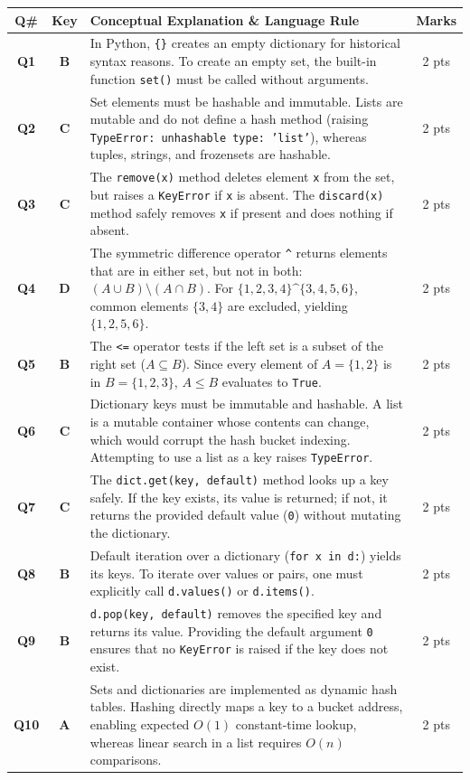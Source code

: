 \documentclass[11pt,a4paper]{article}
\begin{document}
\begin{center}
\renewcommand{\arraystretch}{1.28}
\small
\begin{tabularx}{\textwidth}{|c|c|X|c|}
\hline
\textbf{Q\#} & \textbf{Key} & \textbf{Conceptual Explanation \& Language Rule} & \textbf{Marks} \\
\hline
\textbf{Q1} & \textbf{B} & In Python, \texttt{\{\}} creates an empty dictionary for historical syntax reasons. To create an empty set, the built-in function \texttt{set()} must be called without arguments. & 2 pts \\
\hline
\textbf{Q2} & \textbf{C} & Set elements must be hashable and immutable. Lists are mutable and do not define a hash method (raising \texttt{TypeError: unhashable type: 'list'}), whereas tuples, strings, and frozensets are hashable. & 2 pts \\
\hline
\textbf{Q3} & \textbf{C} & The \texttt{remove(x)} method deletes element \texttt{x} from the set, but raises a \texttt{KeyError} if \texttt{x} is absent. The \texttt{discard(x)} method safely removes \texttt{x} if present and does nothing if absent. & 2 pts \\
\hline
\textbf{Q4} & \textbf{D} & The symmetric difference operator \texttt{\textasciicircum} returns elements that are in either set, but not in both: $(A \cup B) \setminus (A \cap B)$. For $\{1,2,3,4\} \text{\textasciicircum} \{3,4,5,6\}$, common elements $\{3,4\}$ are excluded, yielding $\{1,2,5,6\}$. & 2 pts \\
\hline
\textbf{Q5} & \textbf{B} & The \texttt{<=} operator tests if the left set is a subset of the right set ($A \subseteq B$). Since every element of $A=\{1,2\}$ is in $B=\{1,2,3\}$, $A \le B$ evaluates to \texttt{True}. & 2 pts \\
\hline
\textbf{Q6} & \textbf{C} & Dictionary keys must be immutable and hashable. A list is a mutable container whose contents can change, which would corrupt the hash bucket indexing. Attempting to use a list as a key raises \texttt{TypeError}. & 2 pts \\
\hline
\textbf{Q7} & \textbf{C} & The \texttt{dict.get(key, default)} method looks up a key safely. If the key exists, its value is returned; if not, it returns the provided default value (\texttt{0}) without mutating the dictionary. & 2 pts \\
\hline
\textbf{Q8} & \textbf{B} & Default iteration over a dictionary (\texttt{for x in d:}) yields its keys. To iterate over values or pairs, one must explicitly call \texttt{d.values()} or \texttt{d.items()}. & 2 pts \\
\hline
\textbf{Q9} & \textbf{B} & \texttt{d.pop(key, default)} removes the specified key and returns its value. Providing the default argument \texttt{0} ensures that no \texttt{KeyError} is raised if the key does not exist. & 2 pts \\
\hline
\textbf{Q10} & \textbf{A} & Sets and dictionaries are implemented as dynamic hash tables. Hashing directly maps a key to a bucket address, enabling expected $O(1)$ constant-time lookup, whereas linear search in a list requires $O(n)$ comparisons. & 2 pts \\
\hline
\end{tabularx}
\end{center}
\end{document}
